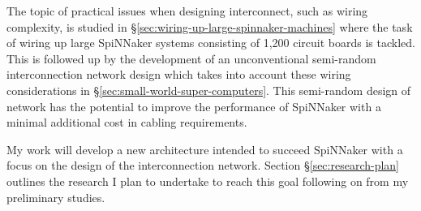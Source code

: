 		The topic of practical issues when designing interconnect, such as wiring
		complexity, is studied in \S\ref{sec:wiring-up-large-spinnaker-machines}
		where the task of wiring up large SpiNNaker systems consisting of 1,200
		circuit boards is tackled. This is followed up by the development of an
		unconventional semi-random interconnection network design which takes into
		account these wiring considerations in
		\S\ref{sec:small-world-super-computers}. This semi-random design of network
		has the potential to improve the performance of SpiNNaker with a minimal
		additional cost in cabling requirements.
	
	
		My work will develop a new architecture intended to succeed SpiNNaker with a
		focus on the design of the interconnection network. Section
		\S\ref{sec:research-plan} outlines the research I plan to undertake to reach
		this goal following on from my preliminary studies.
